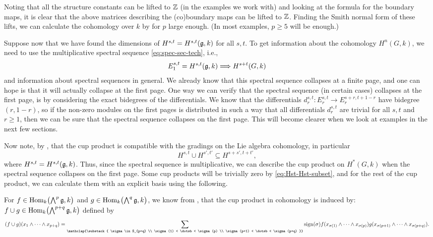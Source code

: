 Noting that all the structure constants can be lifted to $\mathbb{Z}$ (in the examples we work with) and looking at the formula for the boundary maps, it is clear that the above matrices describing the (co)boundary maps can be lifted to $\mathbb{Z}$. Finding the Smith normal form of these lifts, we can calculate the cohomology over $k$ by  for $p$ large enough. (In most examples, $p\geq5$ will be enough.)

Suppose now that we have found the dimensions of $H^{s,t} = H^{s,t}(\mathfrak{g},k)$ for all $s,t$. To get information about the cohomology $H^{n}(G,k)$, we need to use the multiplicative spectral sequence \eqref{eq:spec-sec-tech}, i.e.,
\begin{equation*}
  E_{1}^{s,t} = H^{s,t}(\mathfrak{g}, k) \Longrightarrow H^{s+t}(G,k)
\end{equation*}
and information about spectral sequences in general. We already know that this spectral sequence collapses at a finite page, and one can hope is that it will actually collapse at the first page. One way we can verify that the spectral sequence (in certain cases) collapses at the first page, is by considering the exact bidegrees of the differentials. We know that the differentials $d_{r}^{s,t} \colon E_{r}^{s,t} \to E_{r}^{s+r,t+1-r}$ have bidegree $(r,1-r)$, so if the non-zero modules on the first pages is distributed in such a way that all differentials $d_{r}^{s,t}$ are trivial for all $s,t$ and $r\geq1$, then we can be sure that the spectral sequence collapses on the first page. This will become clearer when we look at examples in the next few sections.

Now note, by \cite[Chap.~1~§3.7]{Fuks}, that the cup product is compatible with the gradings on the Lie algebra cohomology, in particular
\begin{equation}
H^{s,t} \cup H^{s',t'} \subseteq H^{s+s',t+t'},\label{eq:Hst-Hst-subset}
\end{equation}
where $H^{s,t} = H^{s,t}(\mathfrak{g},k)$. Thus, since the spectral sequence is multiplicative, we can describe the cup product on $H^{*}(G,k)$ when the spectral sequence collapses on the first page. Some cup products will be trivially zero by \eqref{eq:Hst-Hst-subset}, and for the rest of the cup product, we can calculate them with an explicit basis using the following.

For $f \in \operatorname{Hom}_{k}\bigl( \bigwedge^{p}\mathfrak{g}, k \bigr)$ and $g \in \operatorname{Hom}_{k}\bigl( \bigwedge^{q}\mathfrak{g}, k \bigr)$, we know from \cite[Chap.~XIII, Sect.~8]{CartanHomAlg}, that the cup product in cohomology is induced by: $f \cup g \in \operatorname{Hom}_{k}\bigl( \bigwedge^{p+q}\mathfrak{g}, k \bigr)$ defined by
\begin{equation}
  \label{eq:cup-prod-def}
  (f \cup g)(x_{1} \wedge \dotsb \wedge x_{p+q})  = \sum_{\mathclap{\substack{ \sigma \in S_{p+q} \\ \sigma(1) < \dotsb < \sigma(p) \\ \sigma(p+1) < \dotsb < \sigma(p+q) }}} \sign(\sigma) f(x_{\sigma(1)} \wedge \dotsb \wedge x_{\sigma(p)}) g(x_{\sigma(p+1)} \wedge \dotsb \wedge x_{\sigma(p+q)}).
\end{equation}

